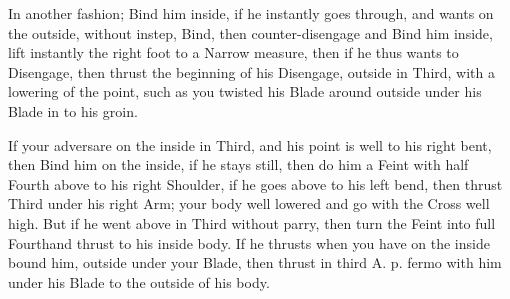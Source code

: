 \newpage


\newpage

\exercise{}
In another fashion; Bind him inside, if he instantly goes through, and
wants on the outside, without instep, Bind, then counter-disengage and
Bind him inside, lift instantly the right foot to a Narrow measure,
then if he thus wants to Disengage, then thrust the beginning of his
Disengage, outside in Third, with a lowering of the point, such as you
twisted his Blade around outside under his Blade in to his groin.

If your adversare on the inside in Third, and his point is well to his
right bent, then Bind him on the inside, if he stays still, then do
him a Feint with half Fourth above to his right Shoulder, if he goes
above to his left bend, then thrust Third under his right Arm; your
body well lowered and go with the Cross well high. But if he went above
in Third without parry, then turn the Feint into full Fourthand thrust
to his inside body. If he thrusts when you have on the inside bound
him, outside under your Blade, then thrust in third A. p. fermo with
him under his Blade to the outside of his body.


